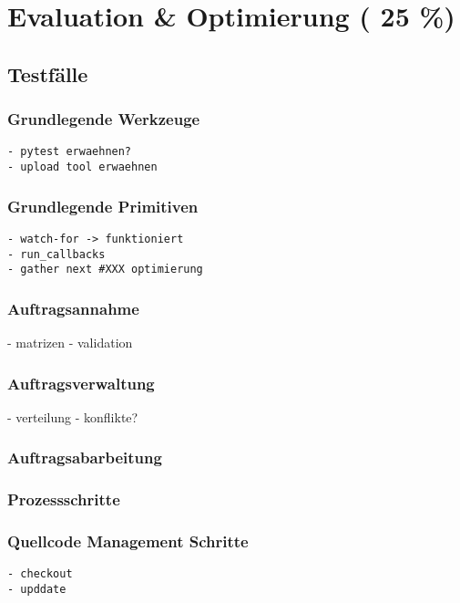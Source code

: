 \chapter{Evaluation \& Optimierung ( 25 \%)}

\section{Testf\"alle}
\subsection{Grundlegende Werkzeuge}

\begin{verbatim}
- pytest erwaehnen?
- upload tool erwaehnen
\end{verbatim}

\subsection{Grundlegende Primitiven}

\begin{verbatim}
- watch-for -> funktioniert
- run_callbacks
- gather next #XXX optimierung
\end{verbatim}

\subsection{Auftragsannahme}
- matrizen
- validation

\subsection{Auftragsverwaltung}
- verteilung
- konflikte?

\subsection{Auftragsabarbeitung}

\subsection{Prozessschritte}
\subsection{Quellcode Management Schritte}

\begin{verbatim}
- checkout
- upddate
\end{verbatim}

